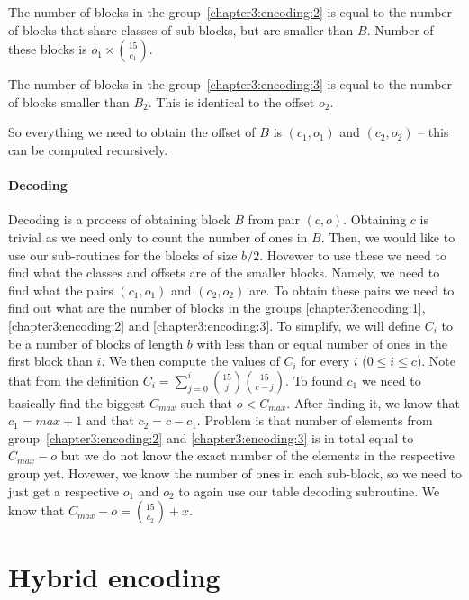 The number of blocks in the group~\ref{chapter3:encoding:2} is equal to the number of blocks that
share classes of sub-blocks, but are smaller than $B$. Number of these blocks is $o_1\times {15\choose c_1}$.

The number of blocks in the group~\ref{chapter3:encoding:3} is equal to the number of blocks smaller 
than $B_2$. This is identical to the offset $o_2$. 

So everything we need to obtain the offset of $B$ is $(c_1, o_1)$ and $(c_2, o_2)$ -- this can be computed
recursively.

\paragraph{Decoding}

Decoding is a process of obtaining block $B$ from pair $(c, o)$. Obtaining $c$ is trivial as we need
only to count the number of ones in $B$. Then, we would like to use our sub-routines for the blocks
of size $b/2$. Hovewer to use these we need to find what the classes and offsets are of the smaller
blocks. Namely, we need to find what the pairs $(c_1, o_1)$ and $(c_2, o_2)$ are. To obtain these
pairs we need to find out what are the number of blocks in the groups \ref{chapter3:encoding:1},
\ref{chapter3:encoding:2} and \ref{chapter3:encoding:3}. To simplify, we will define $C_i$ to be a 
number of blocks of length $b$ with less than or equal number of ones in the first block than $i$.
We then compute the values of $C_i$ for every $i$ ($0\leq i\leq c$). Note that from the definition
$C_i = \sum_{j=0}^{i} {15 \choose j} {15 \choose c-j}$. To found $c_1$ we need to basically find the
biggest $C_{max}$ such that $o<C_{max}$. After finding it, we know that $c_1 = max+1$ and that
$c_2 = c - c_1$. Problem is that number of elements from group~\ref{chapter3:encoding:2} and
\ref{chapter3:encoding:3} is in total equal to $C_{max}-o$ but we do not know the exact number
of the elements in the respective group yet. Hovewer, we know the number of ones in each sub-block,
so we need to just get a respective $o_1$ and $o_2$ to again use our table decoding subroutine. We
know that $C_{max}-o = {15 \choose c_2} + x$.

\section{Hybrid encoding}